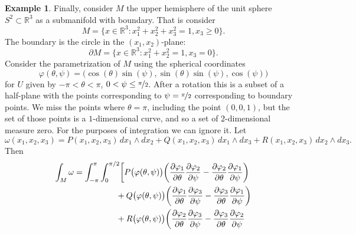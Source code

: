 \documentclass[12pt,openany]{book}
\newcommand{\R}{{\mathbb{R}}}
\theoremstyle{plain}
\theoremstyle{remark}
\theoremstyle{definition}
\theoremstyle{exercise}
\theoremstyle{example}
\newtheorem{example}[thm]{Example}
\begin{document}
\begin{example}
Finally, consider $M$
the upper hemisphere of the unit sphere $S^2 \subset \R^3$ as a submanifold
with boundary.  That is consider
\begin{equation*}
M = \bigl\{ x \in \R^3 : x_1^2+x_2^2+x_3^2=1, x_3 \geq 0 \bigr\} .
\end{equation*}
The boundary is the circle in the $(x_1,x_2)$-plane:
\begin{equation*}
\partial M = \bigl\{ x \in \R^3 : x_1^2+x_2^2=1, x_3 = 0 \bigr\} .
\end{equation*}
Consider the parametrization of $M$ using the spherical coordinates
\begin{equation*}
\varphi(\theta,\psi) =
\bigl(\cos(\theta) \sin(\psi),
 \sin(\theta) \sin(\psi),
 \cos(\psi)\bigr)
\end{equation*}
for $U$ given by $-\pi < \theta < \pi$, $0 < \psi \leq \nicefrac{\pi}{2}$.  After
a rotation this is a subset of a half-plane with the points corresponding to
$\psi = \nicefrac{\pi}{2}$ corresponding to boundary points.  We miss the
points where $\theta = \pi$, including the point $(0,0,1)$, but the set of
those points is a $1$-dimensional curve, and so a set of $2$-dimensional
measure zero. For the purposes of integration we can ignore it.
Let
\begin{equation*}
\omega(x_1,x_2,x_3) =
P(x_1,x_2,x_3) \, dx_1 \wedge dx_2
+ Q(x_1,x_2,x_3) \, dx_1 \wedge dx_3
+ R(x_1,x_2,x_3) \, dx_2 \wedge dx_3 .
\end{equation*}
Then
\begin{equation*}
\begin{split}
\int_M \omega & =
\int_{-\pi}^\pi
\int_{0}^{\pi/2}
\biggl[
P\bigl(\varphi(\theta,\psi)\bigr) \biggl(
\frac{\partial \varphi_1}{\partial \theta}
\frac{\partial \varphi_2}{\partial \psi}
-
\frac{\partial \varphi_2}{\partial \theta}
\frac{\partial \varphi_1}{\partial \psi}
\biggr)
\\
& \hspace{1.8cm}
+
Q\bigl(\varphi(\theta,\psi)\bigr) \biggl(
\frac{\partial \varphi_1}{\partial \theta}
\frac{\partial \varphi_3}{\partial \psi}
-
\frac{\partial \varphi_3}{\partial \theta}
\frac{\partial \varphi_1}{\partial \psi}
\biggr)
\\
& \hspace{1.8cm}
+
R\bigl(\varphi(\theta,\psi)\bigr) \biggl(
\frac{\partial \varphi_2}{\partial \theta}
\frac{\partial \varphi_3}{\partial \psi}
-
\frac{\partial \varphi_3}{\partial \theta}
\frac{\partial \varphi_2}{\partial \psi}

\end{split}
\end{equation*}
\end{example}
\end{document}
